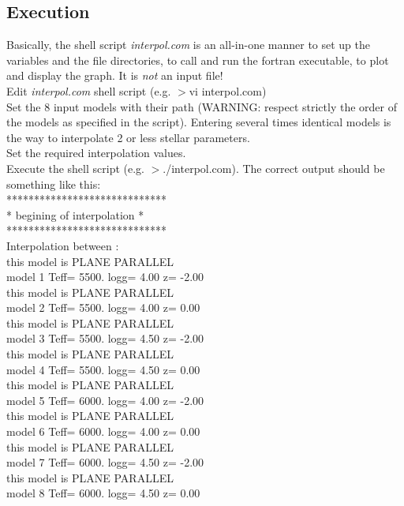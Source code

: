 \documentclass[11pt]{article}
\begin{document}
\subsection{Execution}
Basically, the shell script \textit{interpol.com} is an all-in-one manner to set up the variables and the file directories, to call and run the fortran executable, to plot and display the graph. It is \emph{not} an input file!\\
Edit \textit{interpol.com} shell script (e.g. $>$vi interpol.com) \\
Set the 8 input models with their path (WARNING: respect strictly the order of the models as specified in the script). Entering several times identical models is the way to interpolate 2 or less stellar parameters. \\
Set the required interpolation values.\\
Execute the shell script (e.g. $>$./interpol.com).
The correct output should be something like this:
\\
 *****************************\\
 * begining of interpolation *\\
 *****************************\\
 Interpolation between :\\
  this model is PLANE PARALLEL\\
model 1  Teff=   5500.  logg= 4.00  z= -2.00\\
  this model is PLANE PARALLEL\\
model 2  Teff=   5500.  logg= 4.00  z=  0.00\\
  this model is PLANE PARALLEL\\
model 3  Teff=   5500.  logg= 4.50  z= -2.00\\
  this model is PLANE PARALLEL\\
model 4  Teff=   5500.  logg= 4.50  z=  0.00\\
  this model is PLANE PARALLEL\\
model 5  Teff=   6000.  logg= 4.00  z= -2.00\\
  this model is PLANE PARALLEL\\
model 6  Teff=   6000.  logg= 4.00  z=  0.00\\
  this model is PLANE PARALLEL\\
model 7  Teff=   6000.  logg= 4.50  z= -2.00\\
  this model is PLANE PARALLEL\\
model 8  Teff=   6000.  logg= 4.50  z=  0.00\\
\end{document}

